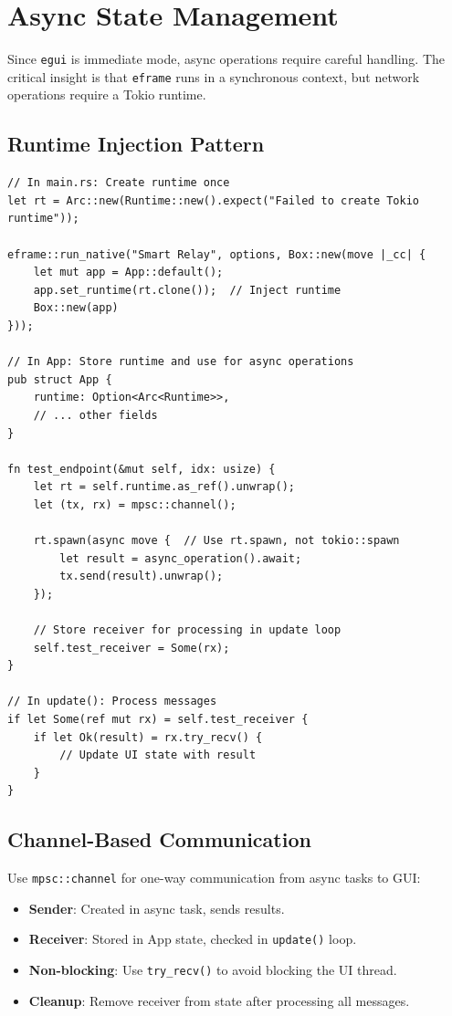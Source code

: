 \section{Async State Management}

Since \texttt{egui} is immediate mode, async operations require careful handling. The critical insight is that \texttt{eframe} runs in a synchronous context, but network operations require a Tokio runtime.

\subsection{Runtime Injection Pattern}

\begin{verbatim}
// In main.rs: Create runtime once
let rt = Arc::new(Runtime::new().expect("Failed to create Tokio runtime"));

eframe::run_native("Smart Relay", options, Box::new(move |_cc| {
    let mut app = App::default();
    app.set_runtime(rt.clone());  // Inject runtime
    Box::new(app)
}));

// In App: Store runtime and use for async operations
pub struct App {
    runtime: Option<Arc<Runtime>>,
    // ... other fields
}

fn test_endpoint(&mut self, idx: usize) {
    let rt = self.runtime.as_ref().unwrap();
    let (tx, rx) = mpsc::channel();
    
    rt.spawn(async move {  // Use rt.spawn, not tokio::spawn
        let result = async_operation().await;
        tx.send(result).unwrap();
    });
    
    // Store receiver for processing in update loop
    self.test_receiver = Some(rx);
}

// In update(): Process messages
if let Some(ref mut rx) = self.test_receiver {
    if let Ok(result) = rx.try_recv() {
        // Update UI state with result
    }
}
\end{verbatim}

\subsection{Channel-Based Communication}

Use \texttt{mpsc::channel} for one-way communication from async tasks to GUI:

\begin{itemize}
    \item \textbf{Sender}: Created in async task, sends results.
    \item \textbf{Receiver}: Stored in App state, checked in \texttt{update()} loop.
    \item \textbf{Non-blocking}: Use \texttt{try\_recv()} to avoid blocking the UI thread.
    \item \textbf{Cleanup}: Remove receiver from state after processing all messages.
\end{itemize}

